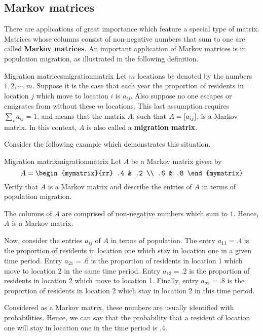 \subsection{Markov matrices}

There are applications of great importance which feature a special type of matrix.  Matrices whose columns consist of non-negative numbers that sum to one are
called \textbf{Markov matrices}. An important application of Markov matrices is
in population migration, as illustrated in the following definition. 

\begin{definition}{Migration matrices}{migrationmatrix}
Let $m$ locations be denoted by the numbers $1,2,\cdots ,m.$ Suppose
it is the case that each year the proportion of residents in location
$j$ which move to location $i$ is $a_{ij}$. Also suppose no one
escapes or emigrates from without these $m$ locations. This last
assumption requires $\sum_{i}a_{ij}=1$, and means that the matrix $A$,
such that $A = \left[a_{ij} \right]$, is a Markov matrix. In this context,
$A$ is also called a \textbf{migration matrix}.
\end{definition}

Consider the following example which demonstrates this situation.

\begin{example}{Migration matrix}{migrationmatrix}
Let $A$ be a Markov matrix given by 
\begin{equation*}
A = 
\begin{mymatrix}{rr}
.4 & .2 \\
.6 & .8
\end{mymatrix}
\end{equation*}
Verify that $A$ is a Markov matrix and describe the entries of $A$ in terms of population migration.
\end{example}

\begin{solution}
The columns of $A$ are comprised of non-negative numbers which sum to $1$. Hence, $A$ is a Markov matrix. 

Now, consider the entries $a_{ij}$ of $A$ in terms of population. The
entry $a_{11} = .4$ is the proportion of residents in location one
which stay in location one in a given time period.  Entry $a_{21} =
.6$ is the proportion of residents in location 1 which move to
location 2 in the same time period. Entry $a_{12} = .2$ is the
proportion of residents in location 2 which move to location
1. Finally, entry $a_{22} = .8$ is the proportion of residents in
location 2 which stay in location 2 in this time period.  

Considered as a Markov matrix, these numbers are usually identified
with probabilities. Hence, we can say that the probability that a
resident of location one will stay in location one in the time period
is $.4$.
\end{solution}

